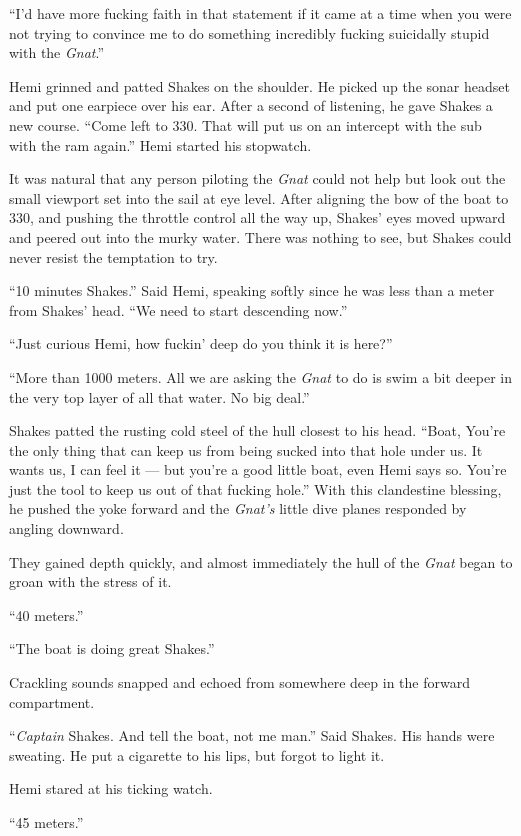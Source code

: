 \documentclass[
]{scrbook}
\begin{document}
``I'd have more fucking faith in that statement if it came at a time
when you were not trying to convince me to do something incredibly
fucking suicidally stupid with the \emph{Gnat}.''

Hemi grinned and patted Shakes on the shoulder. He picked up the sonar
headset and put one earpiece over his ear. After a second of listening,
he gave Shakes a new course. ``Come left to 330. That will put us on an
intercept with the sub with the ram again.'' Hemi started his stopwatch.

It was natural that any person piloting the \emph{Gnat} could not help
but look out the small viewport set into the sail at eye level. After
aligning the bow of the boat to 330, and pushing the throttle control
all the way up, Shakes' eyes moved upward and peered out into the murky
water. There was nothing to see, but Shakes could never resist the
temptation to try.

``10 minutes Shakes.'' Said Hemi, speaking softly since he was less than
a meter from Shakes' head. ``We need to start descending now.''

``Just curious Hemi, how fuckin' deep do you think it is here?''

``More than 1000 meters. All we are asking the \emph{Gnat} to do is swim
a bit deeper in the very top layer of all that water. No big deal.''

Shakes patted the rusting cold steel of the hull closest to his head.
``Boat, You're the only thing that can keep us from being sucked into
that hole under us. It wants us, I can feel it --- but you're a good
little boat, even Hemi says so. You're just the tool to keep us out of
that fucking hole.'' With this clandestine blessing, he pushed the yoke
forward and the \emph{Gnat's} little dive planes responded by angling
downward.

They gained depth quickly, and almost immediately the hull of the
\emph{Gnat} began to groan with the stress of it.

``40 meters.''

``The boat is doing great Shakes.''

Crackling sounds snapped and echoed from somewhere deep in the forward
compartment.

``\emph{Captain} Shakes. And tell the boat, not me man.'' Said Shakes.
His hands were sweating. He put a cigarette to his lips, but forgot to
light it.

Hemi stared at his ticking watch.

``45 meters.''
\end{document}
